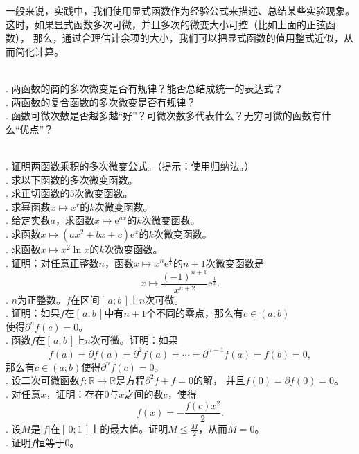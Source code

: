 \documentclass[12pt,UTF8,fontset=none]{ctexbook}
\begin{document}
一般来说，实践中，我们使用显式函数作为经验公式来描述、总结某些实验现象。
这时，如果显式函数多次可微，并且多次的微变大小可控（比如上面的正弦函数），
那么，通过合理估计余项的大小，我们可以把显式函数的值用整式近似，从而简化计算。

\begin{sk}
    \mbox{} \\
    . 两函数的商的多次微变是否有规律？能否总结成统一的表达式？\\
    . 两函数的复合函数的多次微变是否有规律？\\
    . 函数可微次数是否越多越“好”？可微次数多代表什么？无穷可微的函数有什么“优点”？
\end{sk}

\begin{xt}
    \mbox{} \\
    . 证明两函数乘积的多次微变公式。（提示：使用归纳法。）\\
    . 求以下函数的多次微变函数。\\
    . 求正切函数的$5$次微变函数。\\
    . 求幂函数$x\mapsto x^r$的$k$次微变函数。\\
    . 给定实数$a$，求函数$x\mapsto \mathrm{e}^{ax}$的$k$次微变函数。\\
    . 求函数$x \mapsto (ax^2 + bx + c)\mathrm{e}^x$的$k$次微变函数。\\
    . 求函数$x \mapsto x^2\ln{x}$的$k$次微变函数。\\
    . 证明：对任意正整数$n$，函数$x\mapsto x^n \mathrm{e}^{\frac{1}{x}}$的$n+1$次微变函数是
    $$x\mapsto \frac{(-1)^{n+1}}{x^{n+2}}\mathrm{e}^{\frac{1}{x}}.$$
    . $n$为正整数。$f$在区间$[\,a; b\,]$上$n$次可微。\\
    . 证明：如果$f$在$[\,a; b\,]$中有$n+1$个不同的零点，那么有$c\in(a; b)$\\
    \indent 使得$\partial^n f(c) = 0$。\\
    . 函数$f$在$[\,a; b\,]$上$n$次可微。证明：如果
    $$f(a) = \partial f(a) = \partial^2 f(a) = \cdots = \partial^{n-1} f(a) = f(b) = 0,$$
    \indent 那么有$c\in(a; b)$使得$\partial^n f(c) = 0$。\\
    . 设二次可微函数$f:\mathbb{R} \rightarrow \mathbb{R}$是方程$\partial^2 f + f = 0$的解，
    并且$f(0) = \partial f(0) = 0$。\\
    . 对任意$x$，证明：存在$0$与$x$之间的数$c$，使得
    $$ f(x) = -\frac{f(c)x^2}{2}. $$
    . 设$M$是$|f|$在$[\,0;1\,]$上的最大值。证明$M \leqslant \frac{M}{2}$，从而$M = 0$。\\
    . 证明$f$恒等于$0$。\\
\end{xt}
\end{document}
